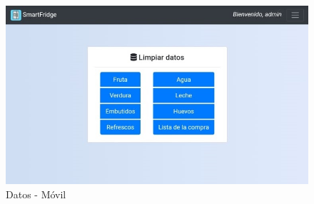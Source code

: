 \begin{figure}[h] 
    \centering
    \includegraphics[width=.50\textwidth]{capitulos/anexotres/Phone/DataBase.jpeg}
    \caption{Datos - Móvil}
    \label{fig:databasephone}
\end{figure}